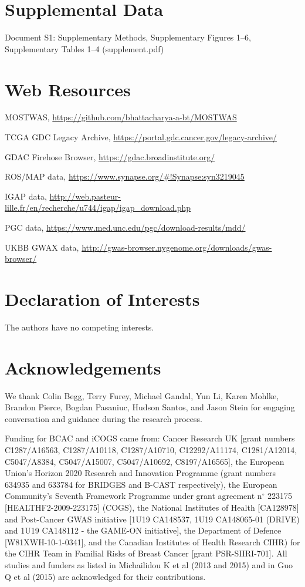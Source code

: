 \section{Supplemental Data}

\noindent Document S1: Supplementary Methods,
Supplementary Figures 1--6, Supplementary
Tables 1--4 (supplement.pdf)

\section{Web Resources}

MOSTWAS, \url{https://github.com/bhattacharya-a-bt/MOSTWAS}

TCGA GDC Legacy Archive, \url{https://portal.gdc.cancer.gov/legacy-archive/}

GDAC Firehose Browser, \url{https://gdac.broadinstitute.org/}

ROS/MAP data, \url{https://www.synapse.org/#!Synapse:syn3219045}

IGAP data, \url{http://web.pasteur-lille.fr/en/recherche/u744/igap/igap_download.php}

PGC data, \url{https://www.med.unc.edu/pgc/download-results/mdd/}

UKBB GWAX data, \url{http://gwas-browser.nygenome.org/downloads/gwas-browser/}

\section{Declaration of Interests}

The authors have no competing interests.

\section{Acknowledgements}
We thank Colin Begg, Terry Furey, Michael Gandal, 
Yun Li, Karen Mohlke, Brandon Pierce, Bogdan Pasaniuc,
Hudson Santos, and Jason Stein for
engaging conversation and 
guidance during the research process.

Funding for BCAC and iCOGS
came from: Cancer Research 
UK [grant numbers C1287/A16563,
C1287/A10118, C1287/A10710,
C12292/A11174, C1281/A12014, 
C5047/A8384, C5047/A15007, C5047/A10692,
C8197/A16565], the European Union’s
Horizon 2020 Research and Innovation
Programme (grant numbers 634935 and
633784 for BRIDGES and B-CAST
respectively), the European Community’s
Seventh Framework Programme under grant
agreement n$^\circ$ 223175
[HEALTHF2-2009-223175] (COGS), the
National Institutes of Health [CA128978]
and Post-Cancer GWAS initiative [1U19
CA148537, 1U19 CA148065-01 (DRIVE) and
1U19 CA148112 - the GAME-ON initiative],
the Department of Defence
[W81XWH-10-1-0341], and the Canadian
Institutes of Health Research CIHR) for
the CIHR Team in Familial Risks of Breast
Cancer [grant PSR-SIIRI-701]. All studies
and funders as listed in Michailidou K et
al (2013 and 2015) and in Guo Q et al
(2015) are acknowledged for their
contributions.

